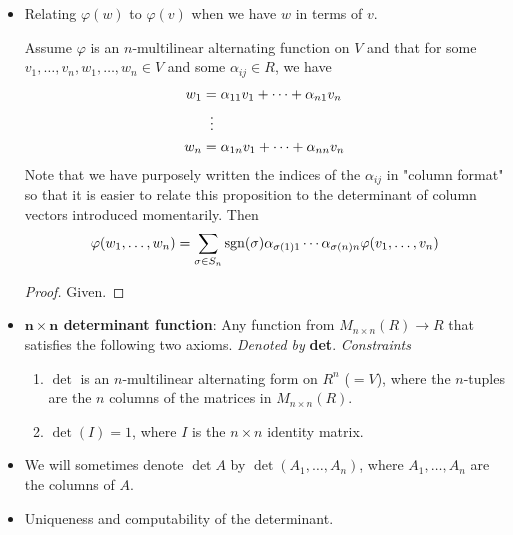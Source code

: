 \documentclass[../notes.tex]{subfiles}
\begin{document}
\begin{itemize}
\begin{proposition}
\begin{enumerate}[ref={\theproposition(\arabic*)}]
        \end{enumerate}
        \begin{proof}
            Given.
        \end{proof}
    \end{proposition}
    \item Relating $\varphi(w)$ to $\varphi(v)$ when we have $w$ in terms of $v$.
    \begin{proposition}\label{prp:11.23}
        Assume $\varphi$ is an $n$-multilinear alternating function on $V$ and that for some $v_1,\dots,v_n,w_1,\dots,w_n\in V$ and some $\alpha_{ij}\in R$, we have
        \begin{align*}
            w_1 &= \alpha_{11}v_1+\cdots+\alpha_{n1}v_n\\
            &\hspace{2mm}\vdots\\
            w_n &= \alpha_{1n}v_1+\cdots+\alpha_{nn}v_n
        \end{align*}
        Note that we have purposely written the indices of the $\alpha_{ij}$ in "column format" so that it is easier to relate this proposition to the determinant of column vectors introduced momentarily. Then
        \begin{equation*}
            \varphi(w_1,\dots,w_n) = \sum_{\sigma\in S_n}\operatorname{sgn}(\sigma)\alpha_{\sigma(1)1}\cdots\alpha_{\sigma(n)n}\varphi(v_1,\dots,v_n)
        \end{equation*}
        \begin{proof}
            Given.
        \end{proof}
    \end{proposition}
    \item \textbf{$\bm{n\times n}$ determinant function}: Any function from $M_{n\times n}(R)\to R$ that satisfies the following two axioms. \emph{Denoted by} \textbf{det}. \emph{Constraints}
    \begin{enumerate}[label={(\roman*)}]
        \item $\det$ is an $n$-multilinear alternating form on $R^n$ ($=V$), where the $n$-tuples are the $n$ columns of the matrices in $M_{n\times n}(R)$.
        \item $\det(I)=1$, where $I$ is the $n\times n$ identity matrix.
    \end{enumerate}
    \item We will sometimes denote $\det A$ by $\det(A_1,\dots,A_n)$, where $A_1,\dots,A_n$ are the columns of $A$.
    \item Uniqueness and computability of the determinant.

\end{itemize}
\end{document}
